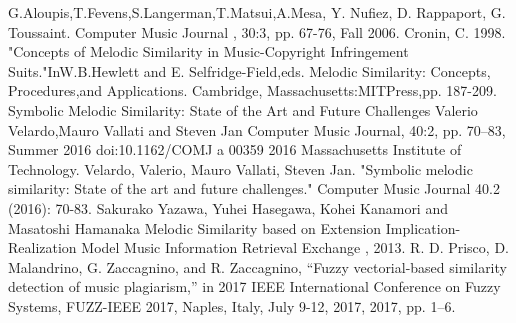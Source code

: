 \documentclass{article}
\begin{document}
	\begin{thebibliography}{9}
		G.Aloupis,T.Fevens,S.Langerman,T.Matsui,A.Mesa, Y. Nufiez, D. Rappaport, G. Toussaint. Computer Music Journal , 30:3, pp. 67-76, Fall 2006.
		Cronin, C. 1998. "Concepts of Melodic Similarity in
		Music-Copyright Infringement Suits."InW.B.Hewlett and E. Selfridge-Field,eds. Melodic Similarity: Concepts, Procedures,and Applications. Cambridge, Massachusetts:MITPress,pp. 187-209.
		Symbolic Melodic Similarity: State of the Art and Future Challenges
		Valerio Velardo,Mauro Vallati and Steven Jan
		Computer Music Journal, 40:2, pp. 70–83, Summer 2016 doi:10.1162/COMJ a 00359
		2016 Massachusetts Institute of Technology.
		Velardo, Valerio, Mauro Vallati, Steven Jan.
		"Symbolic melodic similarity: State of the art and future challenges." Computer Music Journal 40.2 (2016): 70-83.
		Sakurako Yazawa, Yuhei Hasegawa, Kohei Kanamori and Masatoshi Hamanaka
		Melodic Similarity based on Extension Implication-Realization Model
		Music Information Retrieval Exchange , 2013.
		R. D. Prisco, D. Malandrino, G. Zaccagnino, and R. Zaccagnino, “Fuzzy
        vectorial-based similarity detection of music plagiarism,” in 2017 IEEE
        International Conference on Fuzzy Systems, FUZZ-IEEE 2017, Naples,
        Italy, July 9-12, 2017, 2017, pp. 1–6.


	\end{thebibliography}
\end{document}
